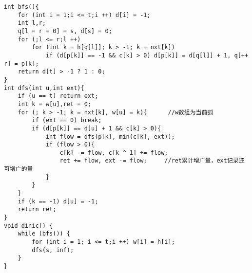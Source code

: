\begin{lstlisting}
int bfs(){
	for (int i = 1;i <= t;i ++) d[i] = -1;
	int l,r;
	q[l = r = 0] = s, d[s] = 0;
	for (;l <= r;l ++)
		for (int k = h[q[l]]; k > -1; k = nxt[k])
			if (d[p[k]] == -1 && c[k] > 0) d[p[k]] = d[q[l]] + 1, q[++ r] = p[k];
	return d[t] > -1 ? 1 : 0;
}
int dfs(int u,int ext){
	if (u == t) return ext;
	int k = w[u],ret = 0;
	for (; k > -1; k = nxt[k], w[u] = k){      //w数组为当前弧 
		if (ext == 0) break;
		if (d[p[k]] == d[u] + 1 && c[k] > 0){
			int flow = dfs(p[k], min(c[k], ext));
			if (flow > 0){
				c[k] -= flow, c[k ^ 1] += flow;
				ret += flow, ext -= flow;     //ret累计增广量，ext记录还可增广的量 
			}
		}
	}
	if (k == -1) d[u] = -1;
	return ret;
}
void dinic() {
	while (bfs()) {
		for (int i = 1; i <= t;i ++) w[i] = h[i];
		dfs(s, inf);
	}
} 
\end{lstlisting}
